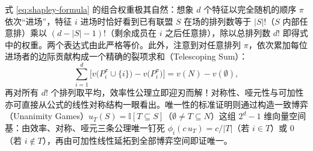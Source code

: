 式 \eqref{eq:shapley-formula} 的组合权重极其自然：想象 $d$ 个特征以完全随机的顺序 $\pi$ 依次“进场”，特征 $i$ 进场时恰好看到已有联盟 $S$ 在场的排列数等于 $|S|!$（$S$ 内部任意排）乘以 $(d - |S| - 1)!$（剩余成员在 $i$ 之后任意排），除以总排列数 $d!$ 即得式中的权重。两个表达式由此严格等价。此外，注意到对任意排列 $\pi$，依次累加每位进场者的边际贡献构成一个精确的裂项求和（Telescoping Sum）：
\[
  \sum_{i=1}^d \Big[v\big(P_i^\pi \cup \{i\}\big) - v\big(P_i^\pi\big)\Big] = v(N) - v(\emptyset),
\]
再对所有 $d!$ 个排列取平均，效率性公理立即迎刃而解！对称性、哑元性与可加性亦可直接从公式的线性对称结构一眼看出。唯一性的标准证明则通过构造一致博弈（Unanimity Games）$u_T(S) = \mathbb{I}[T \subseteq S]$（$\emptyset \neq T \subseteq N$）这组 $2^d - 1$ 维向量空间基：由效率、对称、哑元三条公理唯一钉死 $\phi_i(c\,u_T) = c/|T|$（若 $i \in T$）或 $0$（若 $i \notin T$），再由可加性线性延拓到全部博弈空间即证唯一。

